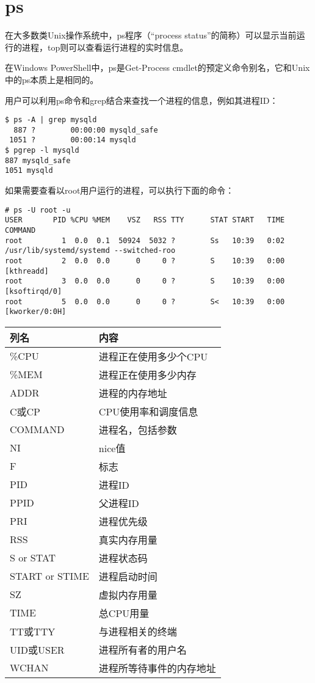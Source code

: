 \section{ps} 

在大多数类Unix操作系统中，ps程序（“process status”的简称）可以显示当前运行的进程，top则可以查看运行进程的实时信息。

在Windows PowerShell中，ps是Get-Process cmdlet的预定义命令别名，它和Unix中的ps本质上是相同的。

用户可以利用ps命令和grep结合来查找一个进程的信息，例如其进程ID：

\begin{verbatim}
$ ps -A | grep mysqld
  887 ?        00:00:00 mysqld_safe
 1051 ?        00:00:14 mysqld
$ pgrep -l mysqld
887 mysqld_safe
1051 mysqld
\end{verbatim}

如果需要查看以root用户运行的进程，可以执行下面的命令：

\begin{verbatim}
# ps -U root -u
USER       PID %CPU %MEM    VSZ   RSS TTY      STAT START   TIME COMMAND
root         1  0.0  0.1  50924  5032 ?        Ss   10:39   0:02 /usr/lib/systemd/systemd --switched-roo
root         2  0.0  0.0      0     0 ?        S    10:39   0:00 [kthreadd]
root         3  0.0  0.0      0     0 ?        S    10:39   0:00 [ksoftirqd/0]
root         5  0.0  0.0      0     0 ?        S<   10:39   0:00 [kworker/0:0H]
\end{verbatim}

\begin{table}[!ht]
\centering
\begin{tabular}{|l|l|}
\hline
列名		&内容\\
\hline
 \%CPU	&进程正在使用多少个CPU\\
\hline
 \%MEM	&进程正在使用多少内存\\
\hline
ADDR	&进程的内存地址\\
\hline
C或CP	&CPU使用率和调度信息\\
\hline
COMMAND	&进程名，包括参数\\
\hline
NI	&nice值\\
\hline
F	&标志\\
\hline
PID	&进程ID\\
\hline
PPID	&父进程ID\\
\hline
PRI	&进程优先级\\
\hline
RSS	&真实内存用量\\
\hline
S or STAT	&进程状态码\\
\hline
START or STIME	&进程启动时间\\
\hline
SZ	&虚拟内存用量\\
\hline
TIME	&总CPU用量\\
\hline
TT或TTY	&与进程相关的终端\\
\hline
UID或USER	&进程所有者的用户名\\
\hline
WCHAN	&进程所等待事件的内存地址\\
\hline
\end{tabular}
\end{table}

